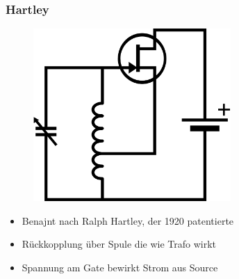 \begin{frame}
  \frametitle{Hartley}
  \begin{center}
    \begin{figure}
      \includegraphics[width=0.67\textwidth,height=.5\textheight,keepaspectratio]{a07/Hartley_osc.png}
    \end{figure}
    \begin{itemize}
      \item Benajnt nach Ralph Hartley, der 1920 patentierte
      \item Rückkopplung über Spule die wie Trafo wirkt
      \item Spannung am Gate bewirkt Strom aus Source
    \end{itemize}
  \end{center}
\end{frame}


